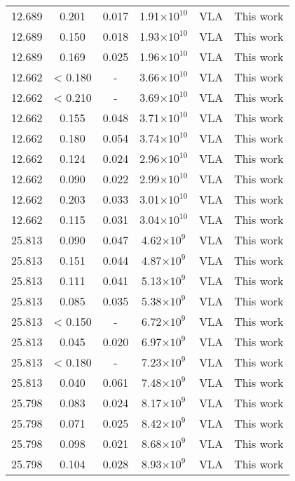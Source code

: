 \documentclass{aa}
\begin{document}
{\begin{longtable}{c|c|c|c|c|c}
 12.689 &   0.201   &  0.017 &  1.91$\times 10^{10}$ &  VLA & This work \\
 12.689 &   0.150   &  0.018 &  1.93$\times 10^{10}$ &  VLA & This work \\
 12.689 &   0.169   &  0.025 &  1.96$\times 10^{10}$ &  VLA & This work \\
 12.662 &   < 0.180 &  -     &  3.66$\times 10^{10}$ &  VLA & This work \\
 12.662 &   < 0.210 &  -     &  3.69$\times 10^{10}$ &  VLA & This work \\
 12.662 &   0.155   &  0.048 &  3.71$\times 10^{10}$ &  VLA & This work \\
 12.662 &   0.180   &  0.054 &  3.74$\times 10^{10}$ &  VLA & This work \\
 12.662 &   0.124   &  0.024 &  2.96$\times 10^{10}$ &  VLA & This work \\
 12.662 &   0.090   &  0.022 &  2.99$\times 10^{10}$ &  VLA & This work \\
 12.662 &   0.203   &  0.033 &  3.01$\times 10^{10}$ &  VLA & This work \\
 12.662 &   0.115   &  0.031 &  3.04$\times 10^{10}$ &  VLA & This work \\
 25.813 &   0.090   &  0.047 &  4.62$\times 10^{9}$  &  VLA & This work \\
 25.813 &   0.151   &  0.044 &  4.87$\times 10^{9}$  &  VLA & This work \\
 25.813 &   0.111   &  0.041 &  5.13$\times 10^{9}$  &  VLA & This work \\
 25.813 &   0.085   &  0.035 &  5.38$\times 10^{9}$  &  VLA & This work \\
 25.813 &   < 0.150 &  -     &  6.72$\times 10^{9}$  &  VLA & This work \\
 25.813 &   0.045   &  0.020 &  6.97$\times 10^{9}$  &  VLA & This work \\
 25.813 &   < 0.180 &  -     &  7.23$\times 10^{9}$  &  VLA & This work \\
 25.813 &   0.040   &  0.061 &  7.48$\times 10^{9}$  &  VLA & This work \\
 25.798 &   0.083   &  0.024 &  8.17$\times 10^{9}$  &  VLA & This work \\
 25.798 &   0.071   &  0.025 &  8.42$\times 10^{9}$  &  VLA & This work \\
 25.798 &   0.098   &  0.021 &  8.68$\times 10^{9}$  &  VLA & This work \\
 25.798 &   0.104   &  0.028 &  8.93$\times 10^{9}$  &  VLA & This work \\

\end{longtable}}
\end{document}
